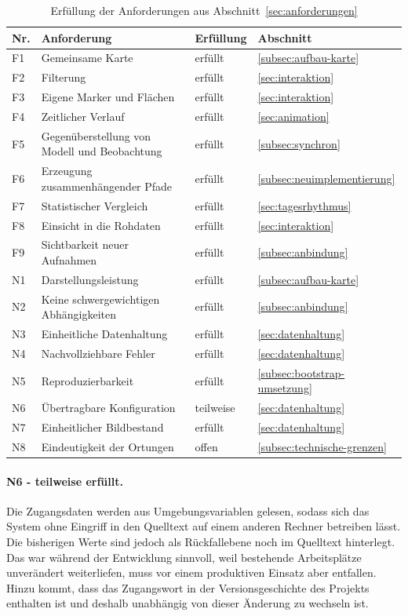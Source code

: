 \documentclass[12pt,a4paper]{report}
\begin{document}
\begin{table}[htbp]
\centering
\caption{Erfüllung der Anforderungen aus Abschnitt~\ref{sec:anforderungen}}
\label{tab:anforderungserfuellung}
\small
\begin{tabular}{L{1.1cm} L{6.6cm} L{2.4cm} L{3.0cm}}
\toprule
\textbf{Nr.} & \textbf{Anforderung} & \textbf{Erfüllung} & \textbf{Abschnitt} \\
\midrule
F1 & Gemeinsame Karte & erfüllt & \ref{subsec:aufbau-karte} \\
F2 & Filterung & erfüllt & \ref{sec:interaktion} \\
F3 & Eigene Marker und Flächen & erfüllt & \ref{sec:interaktion} \\
F4 & Zeitlicher Verlauf & erfüllt & \ref{sec:animation} \\
F5 & Gegenüberstellung von Modell und Beobachtung & erfüllt & \ref{subsec:synchron} \\
F6 & Erzeugung zusammenhängender Pfade & erfüllt & \ref{subsec:neuimplementierung} \\
F7 & Statistischer Vergleich & erfüllt & \ref{sec:tagesrhythmus} \\
F8 & Einsicht in die Rohdaten & erfüllt & \ref{sec:interaktion} \\
F9 & Sichtbarkeit neuer Aufnahmen & erfüllt & \ref{subsec:anbindung} \\
\addlinespace
N1 & Darstellungsleistung & erfüllt & \ref{subsec:aufbau-karte} \\
N2 & Keine schwergewichtigen Abhängigkeiten & erfüllt & \ref{subsec:anbindung} \\
N3 & Einheitliche Datenhaltung & erfüllt & \ref{sec:datenhaltung} \\
N4 & Nachvollziehbare Fehler & erfüllt & \ref{sec:datenhaltung} \\
N5 & Reproduzierbarkeit & erfüllt & \ref{subsec:bootstrap-umsetzung} \\
N6 & Übertragbare Konfiguration & teilweise & \ref{sec:datenhaltung} \\
N7 & Einheitlicher Bildbestand & erfüllt & \ref{sec:datenhaltung} \\
N8 & Eindeutigkeit der Ortungen & offen & \ref{subsec:technische-grenzen} \\
\bottomrule
\end{tabular}
\end{table}

\paragraph{N6 - teilweise erfüllt.} Die Zugangsdaten werden aus Umgebungsvariablen gelesen,
sodass sich das System ohne Eingriff in den Quelltext auf einem anderen Rechner betreiben
lässt. Die bisherigen Werte sind jedoch als Rückfallebene noch im Quelltext hinterlegt. Das
war während der Entwicklung sinnvoll, weil bestehende Arbeitsplätze unverändert weiterliefen,
muss vor einem produktiven Einsatz aber entfallen. Hinzu kommt, dass das Zugangswort in der
Versionsgeschichte des Projekts enthalten ist und deshalb unabhängig von dieser Änderung zu
wechseln ist.
\end{document}
